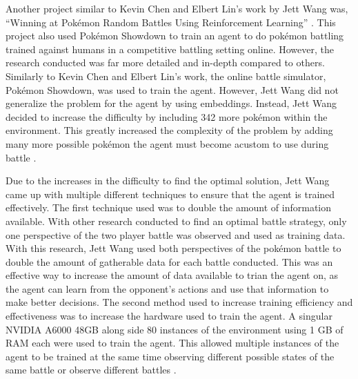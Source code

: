 Another project similar to Kevin Chen and Elbert Lin's work by Jett Wang was, ``Winning at Pokémon Random Battles Using Reinforcement Learning'' \cite{wang2024winning}. This project also used Pokémon Showdown to train an agent to do pokémon battling trained against humans in a competitive battling setting online. However, the research conducted was far more detailed and in-depth compared to others. Similarly to Kevin Chen and Elbert Lin's work, the online battle simulator, Pokémon Showdown, was used to train the agent. However, Jett Wang did not generalize the problem for the agent by using embeddings. Instead, Jett Wang decided to increase the difficulty by including 342 more pokémon within the environment. This greatly increased the complexity of the problem by adding many more possible pokémon the agent must become acustom to use during battle \cite{wang2024winning}. 

Due to the increases in the difficulty to find the optimal solution, Jett Wang came up with multiple different techniques to ensure that the agent is trained effectively. The first technique used was to double the amount of information available. With other research conducted to find an optimal battle strategy, only one perspective of the two player battle was observed and used as training data. With this research, Jett Wang used both perspectives of the pokémon battle to double the amount of gatherable data for each battle conducted. This was an effective way to increase the amount of data available to trian the agent on, as the agent can learn from the opponent's actions and use that information to make better decisions. The second method used to increase training efficiency and effectiveness was to increase the hardware used to train the agent. A singular NVIDIA A6000 48GB along side 80 instances of the environment using 1 GB of RAM each were used to train the agent. This allowed multiple instances of the agent to be trained at the same time observing different possible states of the same battle or observe different battles \cite{wang2024winning}. 
 

